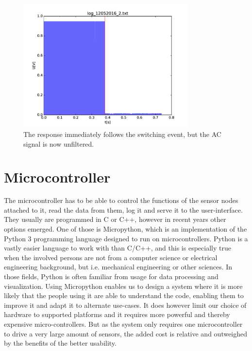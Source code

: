 \begin{figure}
	\begin{center}
		\includegraphics[width=0.8\textwidth]{images/switch_nocap.pdf} 
		\caption{The response immediately follows the switching event, but the AC signal is now unfiltered.}
		\label{fig:swnocap}
	\end{center}
\end{figure}

\section{Microcontroller} \label{uc}

The microcontroller has to be able to control the functions of the sensor nodes attached to it, read the data from them, log it and serve it to the user-interface. They usually are programmed in C or C++, however in recent years other options emerged. One of those is Micropython, which is an implementation of the Python 3 programming language designed to run on microcontrollers. Python is a vastly easier language to work with than C/C++, and this is especially true when the involved persons are not from a computer science or electrical engineering background, but i.e. mechanical engineering or other sciences. In those fields, Python is often familiar from usage for data processing and visualization. Using Micropython enables us to design a system where it is more likely that the people using it are able to understand the code, enabling them to improve it and adapt it to alternate use-cases.
It does however limit our choice of hardware to supported platforms and it requires more powerful and thereby expensive micro-controllers. But as the system only requires one microcontroller to drive a very large amount of sensors, the added cost is relative and outweighed by the benefits of the better usability.\\

